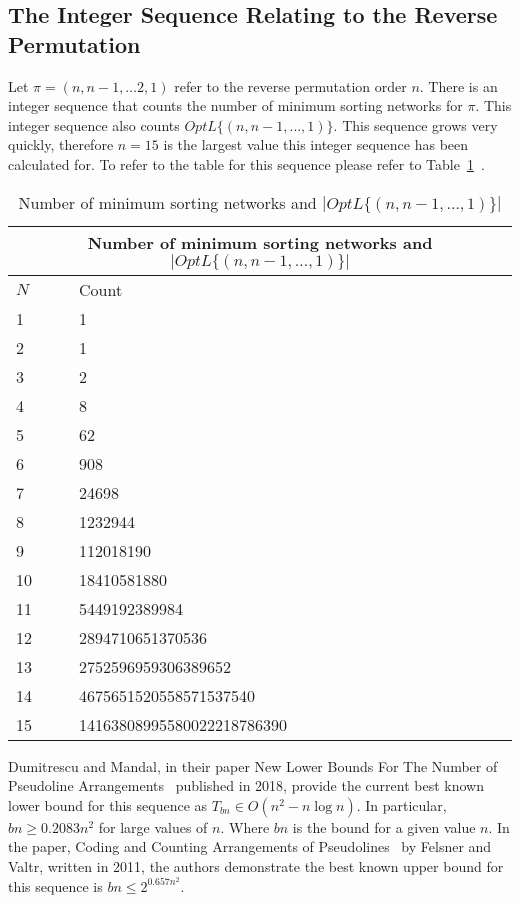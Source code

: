 \subsection{The Integer Sequence Relating to the Reverse Permutation}
Let $\pi=(n,n-1, \dots 2,1)$ refer to the reverse permutation order $n$. 
There is an integer sequence that counts the number of minimum sorting networks 
for $\pi$. This integer sequence also counts $OptL\{(n,n-1, \dots ,1)\}$. This sequence grows very quickly, therefore $n=15$ 
is  the largest value this integer sequence has been calculated for. To refer to the table for this sequence 
please refer to Table~\ref{Tab:IntSeq1}~\cite{A30}.
\begin{table}[t]
    \begin{center}
    \caption{Number of minimum sorting networks and $|OptL\{(n,n-1, \dots, 1)\}|$}        
    \label{Tab:IntSeq1}
    \begin{tabular}{|p{2cm}||p{7cm}|}
        \hline
        \multicolumn{2}{|c|}{Number of minimum sorting networks and $|OptL\{(n,n-1, \dots, 1)\}|$}\\
        \hline
        $N$ & Count \\ 
        \hline 
        1 & 1\\
        \hline 
        2 & 1\\
        \hline 
        3 & 2 \\
        \hline 
        4 & 8 \\
        \hline 
        5 & 62 \\
        \hline 
        6 & 908 \\
        \hline 
        7 & 24698 \\
        \hline 
        8 & 1232944 \\
        \hline 
        9 & 112018190 \\
        \hline 
        10 & 18410581880 \\
        \hline 
        11 & 5449192389984 \\ 
        \hline 
        12 & 2894710651370536 \\
        \hline 
        13 & 2752596959306389652 \\
        \hline 
        14 & 4675651520558571537540 \\
        \hline 
        15 & 14163808995580022218786390 \\
        \hline 
    \end{tabular}
    \end{center}
\end{table}\par
Dumitrescu and Mandal, in their paper New Lower Bounds For The Number of Pseudoline Arrangements~\cite{A33}
published in 2018, provide the current best known lower bound for this sequence as  
$T_{bn} \in O(n^{2} - n\log{}n)$. In particular, $bn \geq 0.2083 n^{2}$
for large values of $n$. Where $bn$ is the bound for a given value $n$. In the paper, Coding 
and Counting Arrangements of Pseudolines~\cite{A32} by Felsner and Valtr, written in 2011, the authors demonstrate 
the best known upper bound for this sequence is $bn \leq 2^{0.657n^{2}}$.\par 

